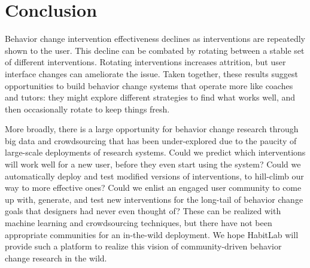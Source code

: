 \section{Conclusion}

Behavior change intervention effectiveness declines as interventions are repeatedly shown to the user. This decline can be combated by rotating between a stable set of different interventions. Rotating interventions increases attrition, but user interface changes can ameliorate the issue. Taken together, these results suggest opportunities to build behavior change systems that operate more like coaches and tutors: they might explore different strategies to find what works well, and then occasionally rotate to keep things fresh. %

More broadly, there is a large opportunity for behavior change research through big data and crowdsourcing that has been under-explored due to the paucity of large-scale deployments of research systems. Could we predict which interventions will work well for a new user, before they even start using the system? Could we automatically deploy and test modified versions of interventions, to hill-climb our way to more effective ones? Could we enlist an engaged user community to come up with, generate, and test new interventions for the long-tail of behavior change goals that designers had never even thought of? These can be realized with machine learning and crowdsourcing techniques, but there have not been appropriate communities for an in-the-wild deployment. We hope HabitLab will provide such a platform to realize this vision of community-driven behavior change research  in the wild. %




